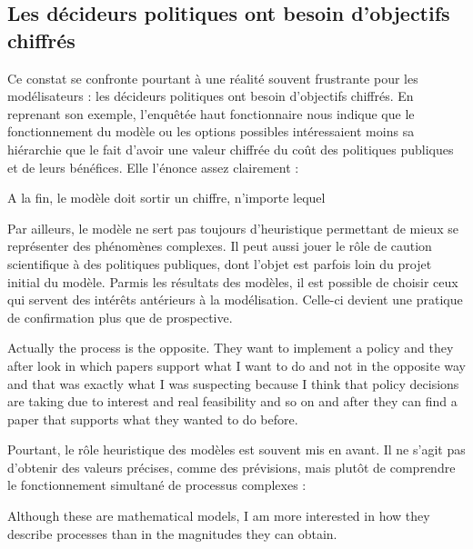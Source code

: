 \subsection{Les décideurs politiques ont besoin d'objectifs chiffrés}

Ce constat se confronte pourtant à une réalité souvent frustrante pour les modélisateurs : les décideurs politiques ont besoin d'objectifs chiffrés. En reprenant son exemple, l'enquêtée haut fonctionnaire nous indique que le fonctionnement du modèle ou les options possibles intéressaient moins sa hiérarchie que le fait d'avoir une valeur chiffrée du coût des politiques publiques et de leurs bénéfices. Elle l'énonce assez clairement :  

\begin{authoredquote}
    A la fin, le modèle doit sortir un chiffre, n'importe lequel
\end{authoredquote}

Par ailleurs, le modèle ne sert pas toujours d'heuristique permettant de mieux se représenter des phénomènes complexes. Il peut aussi jouer le rôle de caution scientifique à des politiques publiques, dont l'objet est parfois loin du projet initial du modèle. Parmis les résultats des modèles, il est possible de choisir ceux qui servent des intérêts antérieurs à la modélisation. Celle-ci devient une pratique de confirmation plus que de prospective. 

\begin{authoredquote}
    Actually the process is the opposite. They want to implement a policy and they after look in  which papers support what I want to do and not in the opposite way and that was exactly what I was  suspecting because I think that policy decisions are taking due to interest and real feasibility  and so on and after they can find a paper that supports what they wanted to do before.
\end{authoredquote}

Pourtant, le rôle heuristique des modèles est souvent mis en avant. Il ne s'agit pas d'obtenir des valeurs précises, comme des prévisions, mais plutôt de comprendre le fonctionnement simultané de processus complexes : 

\begin{authoredquote}
    Although these are mathematical models, I am more interested in how they describe processes than in the magnitudes they can obtain.
\end{authoredquote}

